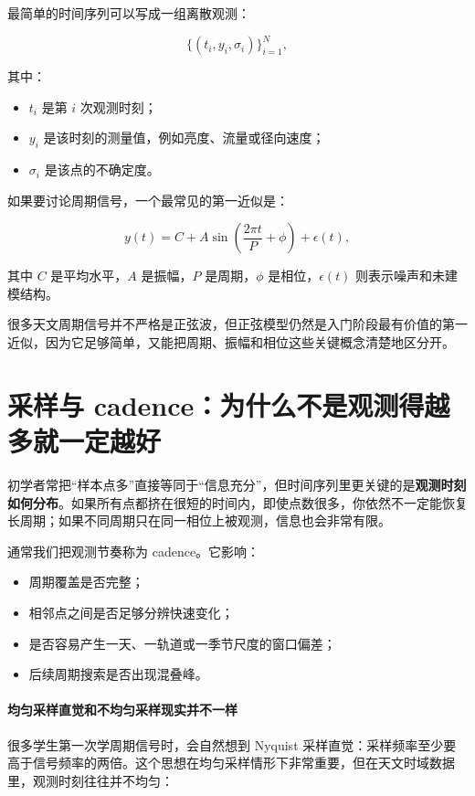 最简单的时间序列可以写成一组离散观测：

\[
\{(t_i, y_i, \sigma_i)\}_{i=1}^N,
\]

其中：

\begin{itemize}
    \item $t_i$ 是第 $i$ 次观测时刻；
    \item $y_i$ 是该时刻的测量值，例如亮度、流量或径向速度；
    \item $\sigma_i$ 是该点的不确定度。
\end{itemize}

如果要讨论周期信号，一个最常见的第一近似是：

\[
y(t) = C + A\sin\left(\frac{2\pi t}{P} + \phi\right) + \epsilon(t),
\]

其中 $C$ 是平均水平，$A$ 是振幅，$P$ 是周期，$\phi$ 是相位，$\epsilon(t)$ 则表示噪声和未建模结构。

\begin{defbox}[周期信号的最小模型]
很多天文周期信号并不严格是正弦波，但正弦模型仍然是入门阶段最有价值的第一近似，因为它足够简单，又能把周期、振幅和相位这些关键概念清楚地区分开。
\end{defbox}

\section{采样与 cadence：为什么不是观测得越多就一定越好}

初学者常把“样本点多”直接等同于“信息充分”，但时间序列里更关键的是\textbf{观测时刻如何分布}。如果所有点都挤在很短的时间内，即使点数很多，你依然不一定能恢复长周期；如果不同周期只在同一相位上被观测，信息也会非常有限。

通常我们把观测节奏称为 cadence。它影响：

\begin{itemize}
    \item 周期覆盖是否完整；
    \item 相邻点之间是否足够分辨快速变化；
    \item 是否容易产生一天、一轨道或一季节尺度的窗口偏差；
    \item 后续周期搜索是否出现混叠峰。
\end{itemize}

\paragraph{均匀采样直觉和不均匀采样现实并不一样}

很多学生第一次学周期信号时，会自然想到 Nyquist 采样直觉：采样频率至少要高于信号频率的两倍。这个思想在均匀采样情形下非常重要，但在天文时域数据里，观测时刻往往并不均匀：

